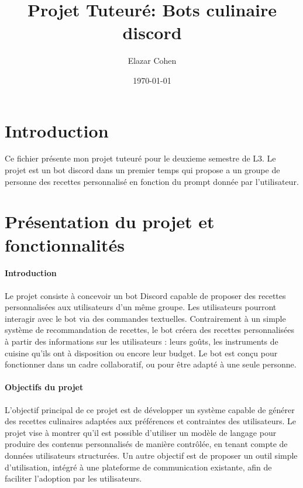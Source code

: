 \documentclass[12pt]{article}
\title{Projet Tuteuré: Bots culinaire discord}
\author{Elazar Cohen}
\date{\today}
\begin{document}
    \maketitle

    \tableofcontents
    \newpage

    \section{Introduction}
        Ce fichier présente mon projet tuteuré pour le deuxieme semestre de L3.
        Le projet est un bot discord dans un premier temps qui propose a un groupe de personne 
        des recettes personnalisé en fonction du prompt donnée par l'utilisateur.

    \section{Présentation du projet et fonctionnalités}

        \paragraph{Introduction}
            Le projet consiste à concevoir un bot Discord capable de proposer des recettes personnalisées aux utilisateurs d’un même groupe.
            Les utilisateurs pourront interagir avec le bot via des commandes textuelles.
            Contrairement à un simple système de recommandation de recettes, le bot créera des recettes personnalisées à partir des informations sur les utilisateurs :
            leurs goûts, les instruments de cuisine qu’ils ont à disposition ou encore leur budget.
            Le bot est conçu pour fonctionner dans un cadre collaboratif, ou pour être adapté à une seule personne.

        \paragraph{Objectifs du projet}
            L’objectif principal de ce projet est de développer un système capable de générer des recettes culinaires adaptées aux préférences et contraintes des utilisateurs.
            Le projet vise à montrer qu’il est possible d’utiliser un modèle de langage pour produire des contenus personnalisés de manière contrôlée, en tenant compte de données utilisateurs structurées.
            Un autre objectif est de proposer un outil simple d’utilisation, intégré à une plateforme de communication existante, afin de faciliter l’adoption par les utilisateurs.
\end{document}
